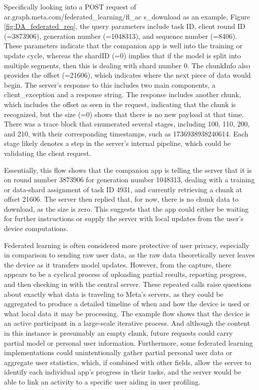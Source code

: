 Specifically looking into a POST request of ar.graph.meta.com/federated\_learning/fl\_ac s\_download as an example, Figure \ref{fig:DA_federated_req}, the query parameters include task ID, client round ID (=3873906), generation number (=1048313), and sequence number (=8406). These parameters indicate that the companion app is well into the training or update cycle, whereas the shardID (=0) implies that if the model is split into multiple segments, then this is dealing with shard number 0. The chunkInfo also provides the offset (=21606), which indicates where the next piece of data would begin. The server's response to this includes two main components, a client\_exception and a response string. The response includes another chunk, which includes the offset as seen in the request, indicating that the chunk is recognized, but the size (=0) shows that there is no new payload at that time. There was a trace block that enumerated several stages, including 100, 110, 200, and 210, with their corresponding timestamps, such as 1736938938240614. Each stage likely denotes a step in the server's internal pipeline, which could be validating the client request.

Essentially, this flow shows that the companion app is telling the server that it is on round number 3873906 for generation number 1048313, dealing with a training or data-shard assignment of task ID 4931, and currently retrieving a chunk at offset 21606. The server then replied that, for now, there is no chunk data to download, as the size is zero. This suggests that the app could either be waiting for further instructions or supply the server with local updates from the user's device computations.

Federated learning is often considered more protective of user privacy, especially in comparison to sending raw user data, as the raw data theoretically never leaves the device as it transfers model updates. However, from the capture, there appears to be a cyclical process of uploading partial results, reporting progress, and then checking in with the central server. These repeated calls raise questions about exactly what data is traveling to Meta's servers, as they could be aggregated to produce a detailed timeline of when and how the device is used or what local data it may be processing. The example flow shows that the device is an active participant in a large-scale iterative process. And although the content in this instance is presumably an empty chunk, future requests could carry partial model or personal user information. Furthermore, some federated learning implementations could unintentionally gather partial personal user data or aggregate user statistics, which, if combined with other fields, allow the server to identify each individual app's progress in their tasks, and the server would be able to link an activity to a specific user aiding in user profiling.



